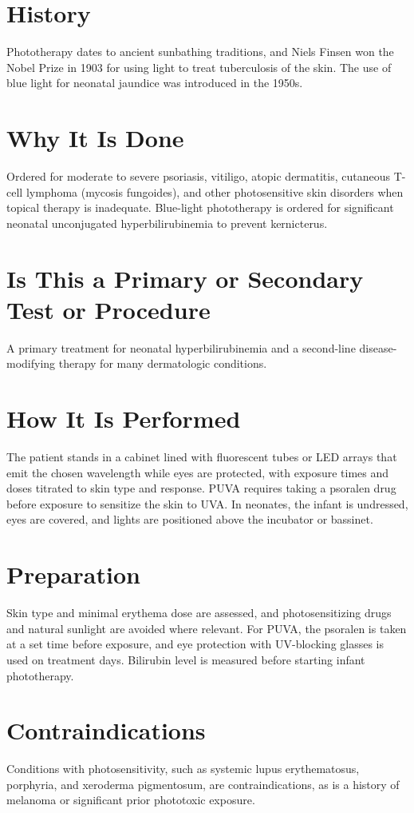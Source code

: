 \section*{History}
Phototherapy dates to ancient sunbathing traditions, and Niels Finsen won the Nobel Prize in 1903 for using light to treat tuberculosis of the skin. The use of blue light for neonatal jaundice was introduced in the 1950s.

\section*{Why It Is Done}
Ordered for moderate to severe psoriasis, vitiligo, atopic dermatitis, cutaneous T-cell lymphoma (mycosis fungoides), and other photosensitive skin disorders when topical therapy is inadequate. Blue-light phototherapy is ordered for significant neonatal unconjugated hyperbilirubinemia to prevent kernicterus.

\section*{Is This a Primary or Secondary Test or Procedure}
A primary treatment for neonatal hyperbilirubinemia and a second-line disease-modifying therapy for many dermatologic conditions.

\section*{How It Is Performed}
The patient stands in a cabinet lined with fluorescent tubes or LED arrays that emit the chosen wavelength while eyes are protected, with exposure times and doses titrated to skin type and response. PUVA requires taking a psoralen drug before exposure to sensitize the skin to UVA. In neonates, the infant is undressed, eyes are covered, and lights are positioned above the incubator or bassinet.

\section*{Preparation}
Skin type and minimal erythema dose are assessed, and photosensitizing drugs and natural sunlight are avoided where relevant. For PUVA, the psoralen is taken at a set time before exposure, and eye protection with UV-blocking glasses is used on treatment days. Bilirubin level is measured before starting infant phototherapy.

\section*{Contraindications}
Conditions with photosensitivity, such as systemic lupus erythematosus, porphyria, and xeroderma pigmentosum, are contraindications, as is a history of melanoma or significant prior phototoxic exposure.

